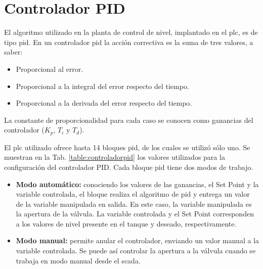 \section{Controlador PID}
\label{sec:controladorpid}

El algoritmo utilizado en la planta de control de nivel, implantado en el
\gls{plc}, es de tipo \gls{pid}.
En un controlador \gls{pid} la acción correctiva es la suma de tres valores, a
saber:

\begin{itemize}
 \item Proporcional al error.
 \item Proporcional a la integral del error respecto del tiempo.
 \item Proporcional a la derivada del error respecto del tiempo.
\end{itemize}
La constante de proporcionalidad para cada caso se conocen como ganancias del
controlador ($K_p$, $T_i$ y $T_d$).

El \gls{plc} utilizado ofrece hasta 14 bloques \gls{pid}, de los cuales se
utilizó sólo uno.
Se muestran en la Tab. \ref{table:controladorpid} los valores utilizados para
la configuración del controlador PID.
Cada bloque \gls{pid} tiene dos modos de trabajo.
\begin{itemize}
 \item \textbf{Modo automático:} conociendo los valores de las ganancias, el
Set Point y la variable controlada, el bloque realiza el algoritmo de \gls{pid} y entrega
un valor de la variable manipulada en salida.
En este caso, la variable manipulada es la apertura de la válvula.
La variable controlada y el Set Point corresponden a los valores de nivel
presente en el tanque y deseado, respectivamente.
 \item \textbf{Modo manual:} permite anular el controlador, enviando un valor
manual a la variable controlada.
Se puede así controlar la apertura a la válvula cuando se
trabaja en modo manual desde el \gls{scada}.

\end{itemize}

